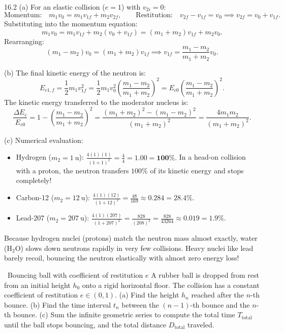 \begin{solution}{16.2}
(a) For an elastic collision ($e = 1$) with $v_{2i} = 0$:
\[
\text{Momentum:}\quad m_1 v_0 = m_1 v_{1f} + m_2 v_{2f}, \qquad \text{Restitution:}\quad v_{2f} - v_{1f} = v_0 \implies v_{2f} = v_0 + v_{1f}.
\]
Substituting into the momentum equation:
\[
m_1 v_0 = m_1 v_{1f} + m_2(v_0 + v_{1f}) = (m_1 + m_2)v_{1f} + m_2 v_0.
\]
Rearranging:
\[
(m_1 - m_2)v_0 = (m_1 + m_2)v_{1f} \implies \boxed{v_{1f} = \frac{m_1 - m_2}{m_1 + m_2}v_0.}
\]

(b) The final kinetic energy of the neutron is:
\[
E_{c1,f} = \frac{1}{2}m_1 v_{1f}^2 = \frac{1}{2}m_1 v_0^2\left(\frac{m_1 - m_2}{m_1 + m_2}\right)^2 = E_{c0}\left(\frac{m_1 - m_2}{m_1 + m_2}\right)^2.
\]
The kinetic energy transferred to the moderator nucleus is:
\[
\frac{\Delta E_c}{E_{c0}} = 1 - \left(\frac{m_1 - m_2}{m_1 + m_2}\right)^2 = \frac{(m_1 + m_2)^2 - (m_1 - m_2)^2}{(m_1 + m_2)^2} = \boxed{\frac{4m_1 m_2}{(m_1 + m_2)^2}.}
\]

(c) Numerical evaluation:
\begin{itemize}[leftmargin=1.4em,itemsep=2pt]
  \item Hydrogen ($m_2 = 1\ \mathrm{u}$): $\frac{4(1)(1)}{(1+1)^2} = \frac{4}{4} = \mathbf{1.00 = 100\%.}$ In a head-on collision with a proton, the neutron transfers $100\%$ of its kinetic energy and stops completely!
  \item Carbon-12 ($m_2 = 12\ \mathrm{u}$): $\frac{4(1)(12)}{(1+12)^2} = \frac{48}{169} \approx \mathbf{0.284 = 28.4\%.}$
  \item Lead-207 ($m_2 = 207\ \mathrm{u}$): $\frac{4(1)(207)}{(1+207)^2} = \frac{828}{(208)^2} = \frac{828}{43264} \approx \mathbf{0.019 = 1.9\%.}$
\end{itemize}
Because hydrogen nuclei (protons) match the neutron mass almost exactly, water ($\mathrm{H_2O}$) slows down neutrons rapidly in very few collisions. Heavy nuclei like lead barely recoil, bouncing the neutron elastically with almost zero energy loss!
\end{solution}

\begin{exercise}{\core\ Bouncing ball with coefficient of restitution $e$}
A rubber ball is dropped from rest from an initial height $h_0$ onto a rigid horizontal floor. The collision has a constant coefficient of restitution $e \in (0, 1)$.
(a) Find the height $h_n$ reached after the $n$-th bounce.
(b) Find the time interval $t_n$ between the $(n-1)$-th bounce and the $n$-th bounce.
(c) Sum the infinite geometric series to compute the total time $T_{\text{total}}$ until the ball stops bouncing, and the total distance $D_{\text{total}}$ traveled.
\end{exercise}

